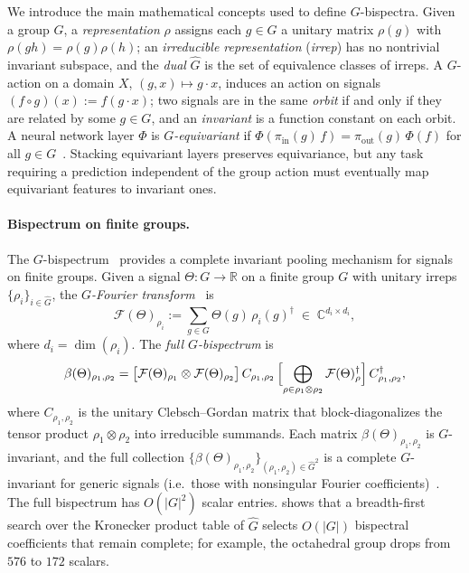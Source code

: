 \documentclass{article}
\theoremstyle{definition}
\theoremstyle{remark}
\newcommand{\R}{\mathbb{R}}
\newcommand{\C}{\mathbb{C}}
\theoremstyle{definition}
\begin{document}
We introduce the main mathematical concepts used to define $G$-bispectra.
Given a group $G$, a \emph{representation} $\rho$ assigns each $g\in G$ a
unitary matrix $\rho(g)$ with $\rho(gh)=\rho(g)\rho(h)$; an
\emph{irreducible representation} (\emph{irrep}) has no nontrivial
invariant subspace, and the \emph{dual} $\hat{G}$ is the set of equivalence
classes of irreps. A $G$-action on a domain $X$,
$(g,x)\mapsto g\cdot x$, induces an action on signals
$(f\circ g)(x):= f(g\cdot x)$; two signals are in the same \emph{orbit}
if and only if they are related by some $g\in G$, and an \emph{invariant}
is a function constant on each orbit.
A neural network layer $\Phi$ is \emph{$G$-equivariant} if
$\Phi(\pi_{\mathrm{in}}(g)\, f) = \pi_{\mathrm{out}}(g)\, \Phi(f)$
for all $g \in G$~\citep{cohen2016group, weiler2019general}.
Stacking equivariant layers preserves equivariance, but any task requiring
a prediction independent of the group action must eventually map equivariant
features to invariant ones.

\paragraph{Bispectrum on finite groups.}
The $G$-bispectrum~\citep{kakarala1992triple, mataigne2024selective}
provides a complete invariant pooling mechanism for signals on finite
groups. Given a signal $\Theta : G \to \R$ on a finite group $G$ with
unitary irreps $\{\rho_i\}_{i\in\hat{G}}$, the \emph{$G$-Fourier
transform}~\citep{diaconis1990fourier} is
\begin{equation}\label{eq:fourier-finite}
  \mathcal{F}(\Theta)_{\rho_i}
  := \sum_{g \in G} \Theta(g)\, \rho_i(g)^{\dagger}
  \;\in\; \C^{d_i \times d_i},
\end{equation}
where $d_i = \dim(\rho_i)$. The \emph{full $G$-bispectrum} is
\begin{equation}\label{eq:bispectrum-def}
  \beta(\Theta)_{\rho_1,\rho_2}
  = \bigl[\mathcal{F}(\Theta)_{\rho_1} \otimes
    \mathcal{F}(\Theta)_{\rho_2}\bigr]\,
    C_{\rho_1,\rho_2}\,
    \Bigl[\bigoplus_{\rho \in \rho_1 \otimes \rho_2}
      \mathcal{F}(\Theta)_{\rho}^{\dagger}\Bigr]\,
    C_{\rho_1,\rho_2}^{\dagger},
\end{equation}
where $C_{\rho_1,\rho_2}$ is the unitary Clebsch--Gordan matrix that
block-diagonalizes the tensor product $\rho_1 \otimes \rho_2$ into
irreducible summands. Each matrix
$\beta(\Theta)_{\rho_1,\rho_2}$ is $G$-invariant, and the full collection
$\{\beta(\Theta)_{\rho_1,\rho_2}\}_{(\rho_1,\rho_2)\in\hat{G}^2}$
is a complete $G$-invariant for generic signals (i.e.\ those with
nonsingular Fourier coefficients)~\citep{kakarala1992triple}.
The full bispectrum has $O(|G|^2)$ scalar entries.
\citet{mataigne2024selective} shows that a breadth-first search over
the Kronecker product table of $\hat{G}$ selects $O(|G|)$ bispectral
coefficients that remain complete; for example, the octahedral group
drops from $576$ to $172$ scalars.
\end{document}
